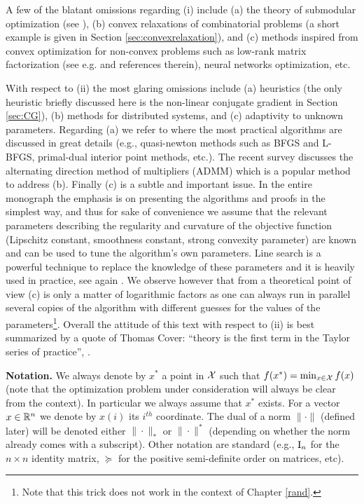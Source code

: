 A few of the blatant omissions regarding (i) include (a) the theory of submodular optimization (see \cite{Bac13}), (b) convex relaxations of combinatorial problems (a short example is given in Section \ref{sec:convexrelaxation}), and (c) methods inspired from convex optimization for non-convex problems such as low-rank matrix factorization (see e.g. \cite{JNS13} and references therein), neural networks optimization, etc. 

With respect to (ii) the most glaring omissions include (a) heuristics (the only heuristic briefly discussed here is the non-linear conjugate gradient in Section \ref{sec:CG}), (b) methods for distributed systems, and (c) adaptivity to unknown parameters. Regarding (a) we refer to \cite{NW06} where the most practical algorithms are discussed in great details (e.g., quasi-newton methods such as BFGS and L-BFGS, primal-dual interior point methods, etc.). The recent survey \cite{BPCPE11} discusses the alternating direction method of multipliers (ADMM) which is a popular method to address (b). Finally (c) is a subtle and important issue. In the entire monograph the emphasis is on presenting the algorithms and proofs in the simplest way, and thus for sake of convenience we assume that the relevant parameters describing the regularity and curvature of the objective function (Lipschitz constant, smoothness constant, strong convexity parameter) are known and can be used to tune the algorithm's own parameters. Line search is a powerful technique to replace the knowledge of these parameters and it is heavily used in practice, see again \cite{NW06}. We observe however that from a theoretical point of view (c) is only a matter of logarithmic factors as one can always run in parallel several copies of the algorithm with different guesses for the values of the parameters\footnote{Note that this trick does not work in the context of Chapter \ref{rand}.}. Overall the attitude of this text with respect to (ii) is best summarized by a quote of Thomas Cover: ``theory is the first term in the Taylor series of practice'', \cite{Cov92}.
\newline

\textbf{Notation.} We always denote by $x^*$ a point in $\mathcal{X}$ such that $f(x^*) = \min_{x \in \mathcal{X}} f(x)$ (note that the optimization problem under consideration will always be clear from the context). In particular we always assume that $x^*$ exists. For a vector $x \in \mathbb{R}^n$ we denote by $x(i)$ its $i^{th}$ coordinate. The dual of a norm $\|\cdot\|$ (defined later) will be denoted either $\|\cdot\|_*$ or $\|\cdot\|^*$ (depending on whether the norm already comes with a subscript). Other notation are standard (e.g., $\mathrm{I}_n$ for the $n \times n$ identity matrix, $\succeq$ for the positive semi-definite order on matrices, etc).

